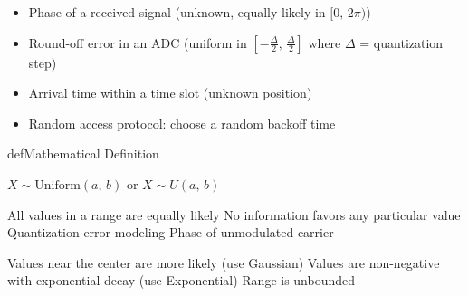 
\begin{itemize}
\tightlist
\item
  Phase of a received signal (unknown, equally likely in $[0,\, 2\pi)$)
\item
  Round-off error in an ADC (uniform in $\left[-\frac{\Delta}{2},\, \frac{\Delta}{2}\right]$ where $\Delta$ = quantization step)
\item
  Arrival time within a time slot (unknown position)
\item
  Random access protocol: choose a random backoff time
\end{itemize}

\begin{PSbox}[unbreakable]{def}{Mathematical Definition}

$X \sim \mathrm{Uniform}(a,\, b)$ or $X \sim U(a,\, b)$

\end{PSbox}










\PSyes{} All values in a range are equally likely\PSbr{}\PSyes{} No information favors any particular value\PSbr{}\PSyes{} Quantization error modeling\PSbr{}\PSyes{} Phase of unmodulated carrier


\PSno{} Values near the center are more likely (use Gaussian)\PSbr{}\PSno{} Values are non-negative with exponential decay (use Exponential)\PSbr{}\PSno{} Range is unbounded

